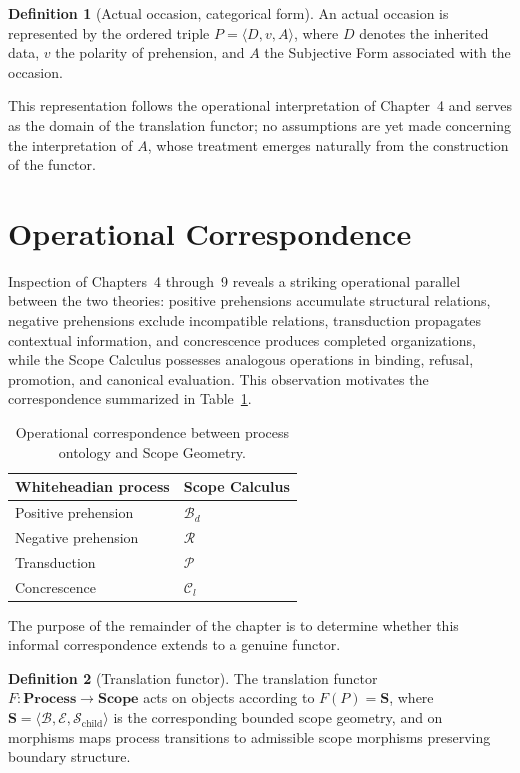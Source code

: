 \documentclass[11pt,twoside,openright]{book}
\numberwithin{equation}{chapter}
\theoremstyle{definition}
\newtheorem{definition}{Definition}[chapter]
\theoremstyle{plain}
\theoremstyle{remark}
\theoremstyle{definition}
\newcommand{\CatScope}{\mathbf{Scope}}
\newcommand{\CatProcess}{\mathbf{Process}}
\newcommand{\Scope}{\mathbf{S}}
\newcommand{\Pop}{\mathcal{P}}
\newcommand{\Refuse}{\mathcal{R}}
\newcommand{\Bind}{\mathcal{B}_d}
\newcommand{\Collapse}{\mathcal{C}_l}
\newcommand{\Boundary}{\mathcal{B}}
\newcommand{\Interior}{\mathcal{E}}
\newcommand{\Children}{\mathcal{S}_{\mathrm{child}}}
\newcommand{\WData}{D}
\newcommand{\WPrehensions}{P}
\newcommand{\WValuation}{v}
\newcommand{\WSubjForm}{A}
\begin{document}
\begin{definition}[Actual occasion, categorical form]
An actual occasion is represented by the ordered triple
$\WPrehensions=\langle\WData,\WValuation,\WSubjForm\rangle$, where $\WData$
denotes the inherited data, $\WValuation$ the polarity of prehension, and
$\WSubjForm$ the Subjective Form associated with the occasion.
\end{definition}

This representation follows the operational interpretation of Chapter~4
and serves as the domain of the translation functor; no assumptions are
yet made concerning the interpretation of $\WSubjForm$, whose treatment
emerges naturally from the construction of the functor.

\section{Operational Correspondence}

Inspection of Chapters~4 through~9 reveals a striking operational
parallel between the two theories: positive prehensions accumulate
structural relations, negative prehensions exclude incompatible relations,
transduction propagates contextual information, and concrescence produces
completed organizations, while the Scope Calculus possesses analogous
operations in binding, refusal, promotion, and canonical evaluation. This
observation motivates the correspondence summarized in
Table~\ref{tab:translation}.

\begin{table}[h]
\centering
\begin{tabular}{ll}
\toprule
Whiteheadian process & Scope Calculus \\
\midrule
Positive prehension & $\Bind$ \\
Negative prehension & $\Refuse$ \\
Transduction & $\Pop$ \\
Concrescence & $\Collapse$ \\
\bottomrule
\end{tabular}
\caption{Operational correspondence between process ontology and Scope
Geometry.}
\label{tab:translation}
\end{table}

The purpose of the remainder of the chapter is to determine whether this
informal correspondence extends to a genuine functor.

\begin{definition}[Translation functor]
The translation functor $F:\CatProcess\to\CatScope$ acts on objects
according to $F(\WPrehensions)=\Scope$, where
$\Scope=\langle\Boundary,\Interior,\Children\rangle$ is the corresponding
bounded scope geometry, and on morphisms maps process transitions to
admissible scope morphisms preserving boundary structure.
\end{definition}
\end{document}
